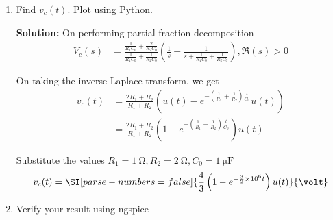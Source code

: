 \documentclass[journal,12pt,twocolumn]{IEEEtran}
\newcommand{\solution}{\noindent \textbf{Solution: }}
\providecommand{\brak}[1]{\ensuremath{\left(#1\right)}}
\providecommand{\system}[1]{\overset{\mathcal{#1}}{ \longleftrightarrow}}
\numberwithin{equation}{section}
\numberwithin{figure}{section}
\renewcommand\thesection{\arabic{section}}
\begin{document}
\begin{enumerate}[label=\thesection.\arabic*.,ref=\thesection.\theenumi]
	where 
	\begin{align}
		u(t) \system{L} V_1(s) \\
		2u(t) \system{L} V_2(s)
	\end{align}
	Find the voltage across the capacitor $V_c(s)$
	
	\solution 
	\begin{align}
		V_1(s) &= \frac{1}{s} &&\Re(s) > 0 \\
		V_2(s) &= \frac{2}{s} &&\Re(s) > 0 
	\end{align}		
		
	By Kirchoff's junction law, we get
	\begin{align}
		&\frac{V_c - V_1}{R_1} + 	\frac{V_c - V_2}{R_2} + \frac{V_c - 0}{\frac{1}{sC_0}} = 0 \\
		\implies &V_c \brak{\frac{1}{R_1} + \frac{1}{R_2} + sC_0} = \frac{V_1}{R_1} + \frac{V_2}{R_2} \\
		\implies &V_c(s) = \frac{\frac{1}{sR_1} + \frac{2}{sR_2}}{\frac{1}{R_1} + \frac{1}{R_2} + sC_0} \\
		&\qquad = \frac{\frac{1}{R_1C_0} + \frac{2}{R_2C_0}}{s\brak{s + \frac{1}{R_1C_0} + \frac{1}{R_2C_0}}} 
	\end{align}
	
	\item Find $v_c(t)$. Plot using Python.

	\solution On performing partial fraction decomposition
	\begin{align} 
		V_c(s) &=  \frac{\frac{1}{R_1C_0} + \frac{2}{R_2C_0}}{\frac{1}{R_1C_0} + \frac{1}{R_2C_0}} \brak{\frac{1}{s} - \frac{1}{s + \frac{1}{R_1C_0} + \frac{1}{R_2C_0}}}, \Re(s) > 0
	\end{align}
	
	On taking the inverse Laplace transform, we get
	\begin{align}
	v_c(t) &= \frac{2R_1 + R_2}{R_1 + R_2} \brak{u(t) - e^{-\brak{\frac{1}{R_1} + \frac{1}{R_2}} \frac{t}{C_0}} u(t)} \\
	&= \frac{2R_1 + R_2}{R_1 + R_2} \brak{1 - e^{-\brak{\frac{1}{R_1} + \frac{1}{R_2}} \frac{t}{C_0}} }u(t)
	\end{align}
	
	Substitute the values $R_1 = \SI{1}{\ohm}, R_2 = \SI{2}{\ohm}, C_0 = \SI{1}{\micro\farad}$
	\begin{align}
		v_c(t) = \SI[parse-numbers=false]{\frac{4}{3} \brak{1 - e^{-\frac{3}{2} \times 10^6 t}} u(t)}{\volt}
	\end{align}
	
	\item Verify your result using ngspice
	  

\end{enumerate}
\end{document}
